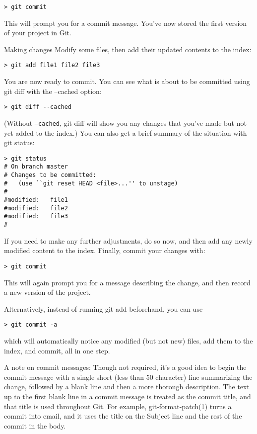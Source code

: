 \documentclass[justified,sixbynine]{tufte-book}
\def\ft{\small\tt}
\theoremstyle{plain}%
\theoremstyle{definition}
\theoremstyle{remark}
\begin{document}
\begin{fullwidth}
\begin{lstlisting}
> git commit
\end{lstlisting}

This will prompt you for a commit message. You've now stored the first version of your project in Git.

Making changes
Modify some files, then add their updated contents to the index:

\begin{lstlisting}
> git add file1 file2 file3
\end{lstlisting}
You are now ready to commit. You can see what is about to be committed using git diff with the --cached option:

\begin{lstlisting}
> git diff --cached
\end{lstlisting}
(Without {\ft --cached}, git diff will show you any changes that you've made but not yet added to the index.) You can also get a brief summary of the situation with git status:

\begin{lstlisting}
> git status
# On branch master
# Changes to be committed:
#   (use ``git reset HEAD <file>...'' to unstage)
#
#modified:   file1
#modified:   file2
#modified:   file3
#
\end{lstlisting}

If you need to make any further adjustments, do so now, and then add any newly modified content to the index. Finally, commit your changes with:

\begin{lstlisting}
> git commit
\end{lstlisting}
This will again prompt you for a message describing the change, and then record a new version of the project.

Alternatively, instead of running git add beforehand, you can use

\begin{lstlisting}
> git commit -a
\end{lstlisting}
which will automatically notice any modified (but not new) files, add them to the index, and commit, all in one step.

A note on commit messages: Though not required, it's a good idea to begin the commit message with a single short (less than 50 character) line summarizing the change, followed by a blank line and then a more thorough description. The text up to the first blank line in a commit message is treated as the commit title, and that title is used throughout Git. For example, git-format-patch(1) turns a commit into email, and it uses the title on the Subject line and the rest of the commit in the body.


\end{fullwidth}
\end{document}
